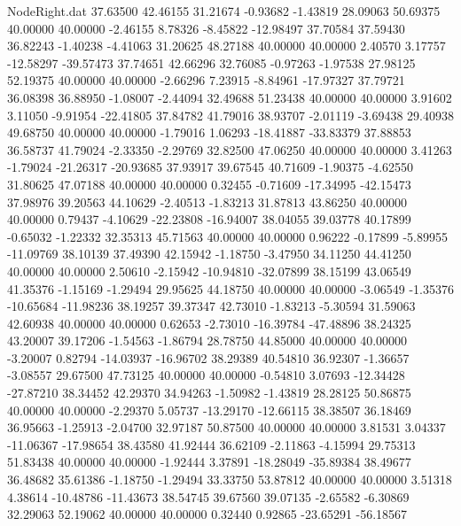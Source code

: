 \begin{filecontents}{NodeRight.dat}
  37.63500   42.46155   31.21674    -0.93682   -1.43819   28.09063   50.69375   40.00000   40.00000   -2.46155    8.78326   -8.45822  -12.98497
  37.70584   37.59430   36.82243    -1.40238   -4.41063   31.20625   48.27188   40.00000   40.00000    2.40570    3.17757  -12.58297  -39.57473
  37.74651   42.66296   32.76085    -0.97263   -1.97538   27.98125   52.19375   40.00000   40.00000   -2.66296    7.23915   -8.84961  -17.97327
  37.79721   36.08398   36.88950    -1.08007   -2.44094   32.49688   51.23438   40.00000   40.00000    3.91602    3.11050   -9.91954  -22.41805
  37.84782   41.79016   38.93707    -2.01119   -3.69438   29.40938   49.68750   40.00000   40.00000   -1.79016    1.06293  -18.41887  -33.83379
  37.88853   36.58737   41.79024    -2.33350   -2.29769   32.82500   47.06250   40.00000   40.00000    3.41263   -1.79024  -21.26317  -20.93685
  37.93917   39.67545   40.71609    -1.90375   -4.62550   31.80625   47.07188   40.00000   40.00000    0.32455   -0.71609  -17.34995  -42.15473
  37.98976   39.20563   44.10629    -2.40513   -1.83213   31.87813   43.86250   40.00000   40.00000    0.79437   -4.10629  -22.23808  -16.94007
  38.04055   39.03778   40.17899    -0.65032   -1.22332   32.35313   45.71563   40.00000   40.00000    0.96222   -0.17899   -5.89955  -11.09769
  38.10139   37.49390   42.15942    -1.18750   -3.47950   34.11250   44.41250   40.00000   40.00000    2.50610   -2.15942  -10.94810  -32.07899
  38.15199   43.06549   41.35376    -1.15169   -1.29494   29.95625   44.18750   40.00000   40.00000   -3.06549   -1.35376  -10.65684  -11.98236
  38.19257   39.37347   42.73010    -1.83213   -5.30594   31.59063   42.60938   40.00000   40.00000    0.62653   -2.73010  -16.39784  -47.48896
  38.24325   43.20007   39.17206    -1.54563   -1.86794   28.78750   44.85000   40.00000   40.00000   -3.20007    0.82794  -14.03937  -16.96702
  38.29389   40.54810   36.92307    -1.36657   -3.08557   29.67500   47.73125   40.00000   40.00000   -0.54810    3.07693  -12.34428  -27.87210
  38.34452   42.29370   34.94263    -1.50982   -1.43819   28.28125   50.86875   40.00000   40.00000   -2.29370    5.05737  -13.29170  -12.66115
  38.38507   36.18469   36.95663    -1.25913   -2.04700   32.97187   50.87500   40.00000   40.00000    3.81531    3.04337  -11.06367  -17.98654
  38.43580   41.92444   36.62109    -2.11863   -4.15994   29.75313   51.83438   40.00000   40.00000   -1.92444    3.37891  -18.28049  -35.89384
  38.49677   36.48682   35.61386    -1.18750   -1.29494   33.33750   53.87812   40.00000   40.00000    3.51318    4.38614  -10.48786  -11.43673
  38.54745   39.67560   39.07135    -2.65582   -6.30869   32.29063   52.19062   40.00000   40.00000    0.32440    0.92865  -23.65291  -56.18567

\end{filecontents}
